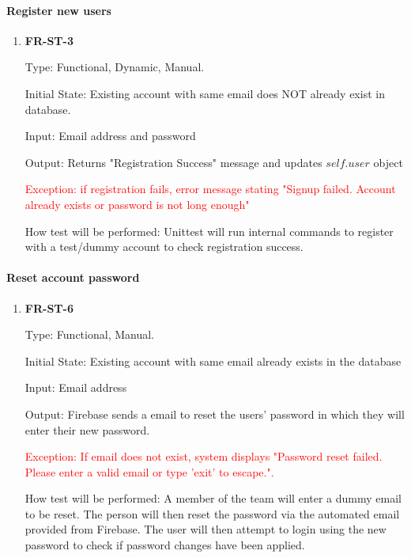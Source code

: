 \documentclass[12pt, titlepage]{article}
\begin{document}
\paragraph{Register new users}
\begin{enumerate}

\item{\textbf{FR-ST-3}}

Type: Functional, Dynamic, Manual.
					
Initial State: Existing account with same email does NOT already exist in database.
					
Input: Email address and password
					
Output: Returns "Registration Success" message and updates $self.user$ object

\textcolor{red}{Exception: if registration fails, error message stating "Signup failed. Account already exists or password is not long enough"}
					
How test will be performed: Unittest will run internal commands to register with a test/dummy account to check registration success.
\end{enumerate}

\paragraph{Reset account password}
\begin{enumerate}

\item{\textbf{FR-ST-6}}

Type: Functional, Manual.
					
Initial State: Existing account with same email already exists in the database
					
Input: Email address
					
Output: Firebase sends a email to reset the users' password in which they will enter their new password.

\textcolor{red}{Exception: If email does not exist, system displays "Password reset failed. Please enter a valid email or type 'exit' to escape.".}
					
How test will be performed: A member of the team will enter a dummy email to be reset. The person will then reset the password via the automated email provided from Firebase. The user will then attempt to login using the new password to check if password changes have been applied.
\end{enumerate}
\end{document}
